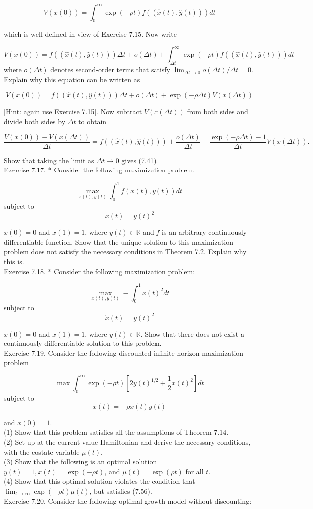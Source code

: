 \documentclass[\topdir/lecture_notes.tex]{subfiles}
\begin{document}
\[
V(x(0))=\int_{0}^{\infty} \exp (-\rho t) f((\hat{x}(t), \hat{y}(t))) d t
\]

which is well defined in view of Exercise 7.15. Now write

\[
V(x(0))=f((\hat{x}(t), \hat{y}(t))) \Delta t+o(\Delta t)+\int_{\Delta t}^{\infty} \exp (-\rho t) f((\hat{x}(t), \hat{y}(t))) d t
\]
where $o(\Delta t)$ denotes second-order terms that satisfy $\lim _{\Delta t \rightarrow 0} o(\Delta t) / \Delta t=0$. Explain why this equation can be written as

\[
V(x(0))=f((\hat{x}(t), \hat{y}(t))) \Delta t+o(\Delta t)+\exp (-\rho \Delta t) V(x(\Delta t))
\]

[Hint: again use Exercise 7.15]. Now subtract $V(x(\Delta t))$ from both sides and divide both sides by $\Delta t$ to obtain

\[
\frac{V(x(0))-V(x(\Delta t))}{\Delta t}=f((\hat{x}(t), \hat{y}(t)))+\frac{o(\Delta t)}{\Delta t}+\frac{\exp (-\rho \Delta t)-1}{\Delta t} V(x(\Delta t)) .
\]

Show that taking the limit as $\Delta t \rightarrow 0$ gives (7.41).\\
Exercise 7.17. * Consider the following maximization problem:

\[
\max _{x(t), y(t)} \int_{0}^{1} f(x(t), y(t)) d t
\]
subject to
\[
\dot{x}(t)=y(t)^{2}
\]

$x(0)=0$ and $x(1)=1$, where $y(t) \in \mathbb{R}$ and $f$ is an arbitrary continuously differentiable function. Show that the unique solution to this maximization problem does not satisfy the necessary conditions in Theorem 7.2. Explain why this is.\\
Exercise 7.18. * Consider the following maximization problem:

\[
\max _{x(t), y(t)}-\int_{0}^{1} x(t)^{2} d t
\]
subject to
\[
\dot{x}(t)=y(t)^{2}
\]

$x(0)=0$ and $x(1)=1$, where $y(t) \in \mathbb{R}$. Show that there does not exist a continuously differentiable solution to this problem.\\
Exercise 7.19. Consider the following discounted infinite-horizon maximization problem

\[
\max \int_{0}^{\infty} \exp (-\rho t)\left[2 y(t)^{1 / 2}+\frac{1}{2} x(t)^{2}\right] d t
\]
subject to
\[
\dot{x}(t)=-\rho x(t) y(t)
\]

and $x(0)=1$.\\
(1) Show that this problem satisfies all the assumptions of Theorem 7.14.\\
(2) Set up at the current-value Hamiltonian and derive the necessary conditions, with the costate variable $\mu(t)$.\\
(3) Show that the following is an optimal solution $y(t)=1, x(t)=\exp (-\rho t)$, and $\mu(t)=\exp (\rho t)$ for all $t$.\\
(4) Show that this optimal solution violates the condition that $\lim _{t \rightarrow \infty} \exp (-\rho t) \mu(t)$, but satisfies (7.56).\\
Exercise 7.20. Consider the following optimal growth model without discounting:
\end{document}
